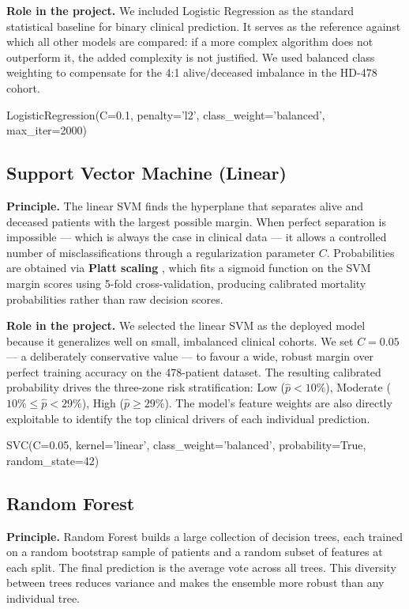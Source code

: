 \documentclass[12pt,a4paper,twoside]{report}
\newcommand{\config}[1]{%
  \vspace{6pt}%
  \noindent\begin{tcolorbox}[
    enhanced, breakable,
    colback=platbg,
    colframe=primary!50,
    boxrule=0.6pt,
    arc=5pt,
    left=10pt, right=8pt, top=4pt, bottom=5pt,
    toptitle=3pt, bottomtitle=3pt,
    fontupper=\ttfamily\footnotesize\color{navydark},
    title={\footnotesize\bfseries Configuration},
    coltitle=white,
    colbacktitle=primary,
    titlerule=0pt
  ]
  #1
  \end{tcolorbox}%
  \vspace{4pt}%
}
\begin{document}
\textbf{Role in the project.} We included Logistic Regression as the standard statistical baseline for binary clinical prediction. It serves as the reference against which all other models are compared: if a more complex algorithm does not outperform it, the added complexity is not justified. We used balanced class weighting to compensate for the 4:1 alive/deceased imbalance in the HD-478 cohort.

\config{LogisticRegression(C=0.1, penalty='l2', class\_weight='balanced', max\_iter=2000)}

\subsection{Support Vector Machine (Linear)}
\label{sec:svm}

\textbf{Principle.} The linear SVM \cite{cortes_vapnik_1995} finds the hyperplane that separates alive and deceased patients with the largest possible margin. When perfect separation is impossible — which is always the case in clinical data — it allows a controlled number of misclassifications through a regularization parameter $C$. Probabilities are obtained via \textbf{Platt scaling} \cite{platt1999}, which fits a sigmoid function on the SVM margin scores using 5-fold cross-validation, producing calibrated mortality probabilities rather than raw decision scores.

\textbf{Role in the project.} We selected the linear SVM as the deployed model because it generalizes well on small, imbalanced clinical cohorts. We set $C=0.05$ — a deliberately conservative value — to favour a wide, robust margin over perfect training accuracy on the 478-patient dataset. The resulting calibrated probability drives the three-zone risk stratification: Low ($\hat{p}<10\%$), Moderate ($10\%\leq\hat{p}<29\%$), High ($\hat{p}\geq29\%$). The model's feature weights are also directly exploitable to identify the top clinical drivers of each individual prediction.

\config{SVC(C=0.05, kernel='linear', class\_weight='balanced', probability=True, random\_state=42)}

\subsection{Random Forest}

\textbf{Principle.} Random Forest \cite{breiman_rf_2001} builds a large collection of decision trees, each trained on a random bootstrap sample of patients and a random subset of features at each split. The final prediction is the average vote across all trees. This diversity between trees reduces variance and makes the ensemble more robust than any individual tree.
\end{document}

